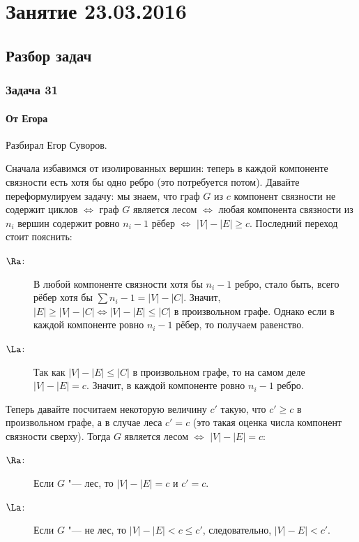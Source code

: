 \chapter{Занятие 23.03.2016}

\section{Разбор задач}
\subsection{Задача 31}
	\subsubsection{От Егора}
		Разбирал Егор Суворов.

		Сначала избавимся от изолированных вершин: теперь в каждой компоненте связности есть хотя бы
		одно ребро (это потребуется потом).
		Давайте переформулируем задачу: мы знаем, что граф $G$ из $c$ компонент связности не содержит циклов
		$\iff$ граф $G$ является лесом
		$\iff$ любая компонента связности из $n_i$ вершин содержит ровно $n_i-1$ рёбер
		$\iff$ $|V|-|E|\ge c$.
		Последний переход стоит пояснить:
		\begin{description}
			\item[$\Ra$:]
				В любой компоненте связности хотя бы $n_i-1$ ребро, стало быть,
				всего рёбер хотя бы $\sum n_i-1 = |V|-|C|$.
				Значит, $|E|\ge|V|-|C| \iff |V|-|E|\le |C|$ в произвольном графе.
				Однако если в каждой компоненте ровно $n_i-1$ рёбер, то получаем равенство.
			\item[$\La$:]
				Так как $|V|-|E|\le |C|$ в произвольном графе, то на самом деле $|V|-|E|=c$.
				Значит, в каждой компоненте ровно $n_i-1$ ребро.
		\end{description}
		Теперь давайте посчитаем некоторую величину $c'$ такую, что $c' \ge c$ в произвольном графе,
		а в случае леса $c'=c$ (это такая оценка числа компонент связности сверху).
		Тогда $G$ является лесом $\iff$ $|V|-|E| = c$:
		\begin{description}
			\item[$\Ra$:]
				Если $G$ "--- лес, то $|V|-|E|=c$ и $c'=c$.
			\item[$\La$:]
				Если $G$ "--- не лес, то $|V|-|E| < c \le c'$, следовательно,
				$|V|-E| < c'$.
		\end{description}

